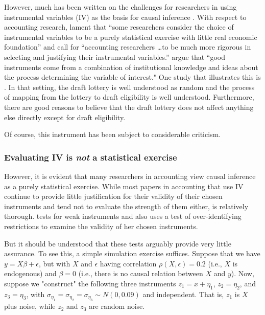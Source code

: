 \documentclass[11pt]{amsart}
\begin{document}
However, much has been written on the challenges for researchers in using instrumental variables (IV) as the basis for causal inference \citep[e.g.,][]{Roberts:2013cz}. 
With respect to accounting research, \citet{Larcker:2010fq} lament that ``some researchers consider the choice of instrumental variables to be a purely statistical exercise with little real economic foundation'' and call for 
``accounting researchers \dots to be much more rigorous in selecting and justifying their instrumental variables.'' 
\citet[p.117]{Angrist:2008vk} argue that ``good instruments come from a combination of institutional knowledge and ideas about the process determining the variable of interest."
One study that illustrates this is \cite{Angrist:2008vk}.
In that setting, the draft lottery is well understood as random and the process of mapping from the lottery to draft eligibility is well understood.
Furthermore, there are good reasons to believe that the draft lottery does not affect anything else directly except for draft eligibility.

Of course, this instrument has been subject to considerable criticism. %

\subsubsection{Evaluating IV is \emph{not} a statistical exercise}
However, it is evident that many researchers in accounting view causal inference as a purely statistical exercise.
While most papers in accounting that use IV continue to provide little justification for their validity of their chosen instruments and tend not to evaluate the strength of them either, \citet{Correia:2014fp} is relatively thorough. 
\citet{Correia:2014fp} tests for weak instruments and also uses a test of over-identifying restrictions to examine the validity of her chosen instruments. 

But it should be understood that these tests arguably provide very little assurance.
To see this, a simple simulation exercise suffices.
Suppose that we have $y = X \beta + \epsilon$, but with $X$ and $\epsilon$ having correlation $\rho(X, \epsilon) = 0.2$ (i.e., $X$ is endogenous) and $\beta = 0$ (i.e., there is no causal relation between $X$ and $y$). 
Now, suppose we "construct" the following three instruments 
$z_1 = x +\eta_1$, $z_2 = \eta_2$, and $z_3 = \eta_3$, with $\sigma_{\eta_1} = \sigma_{\eta_2} = \sigma_{\eta_3} \sim N(0, 0.09)$ and independent. 
That is, $z_1$ is $X$ plus noise, while $z_2$ and $z_3$ are random noise.
\end{document}
